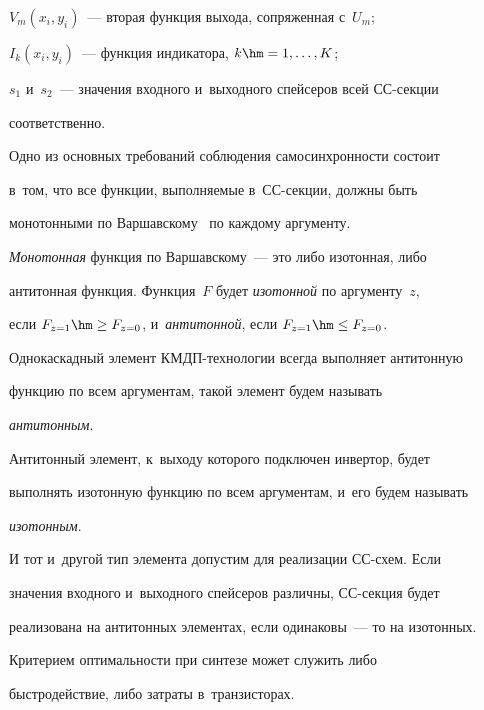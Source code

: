    $V_m (x_i, y_i)$~--- вторая функция выхода, сопряженная с~$U_m$;


   $I_k (x_i, y_i)$~--- функция индикатора, $k \hm =1,\ldots, K$;


   $s_1$ и~$s_2$~--- значения входного и~выходного спейсеров всей СС-сек\-ции 


соответственно.


   


   Одно из основных требований соблюдения самосинхронности состоит 


в~том, что все функции, выполняемые в~СС-сек\-ции, должны быть 


монотонными по Варшавскому~\cite{1-pl} по каждому аргументу.




   \textit{Монотонная} функция по Варшавскому~--- это либо изотонная, либо 


антитонная функция. Функция~$F$ будет \textit{изотонной} по аргументу~$z$, 


если $F_{z=1}\hm\geq F_{z=0}$, и~\textit{антитонной}, если $F_{z=1}\hm\leq 


F_{z=0}$.


   


   Однокаскадный элемент КМДП-технологии всегда выполняет антитонную 


функцию по всем аргументам, такой элемент будем называть 


\textit{антитонным}.


   


   Антитонный элемент, к~выходу которого подключен инвертор, будет 


выполнять изотонную функцию по всем аргументам, и~его будем называть 


\textit{изотонным}.


   


   И тот и~другой тип элемента допустим для реализации СС-схем. Если 


значения входного и~выходного спейсеров различны, СС-сек\-ция будет 


реализована на антитонных элементах, если одинаковы~--- то на изотонных.


   


   Критерием оптимальности при синтезе может служить либо 


быстродействие, либо затраты в~транзисторах.



